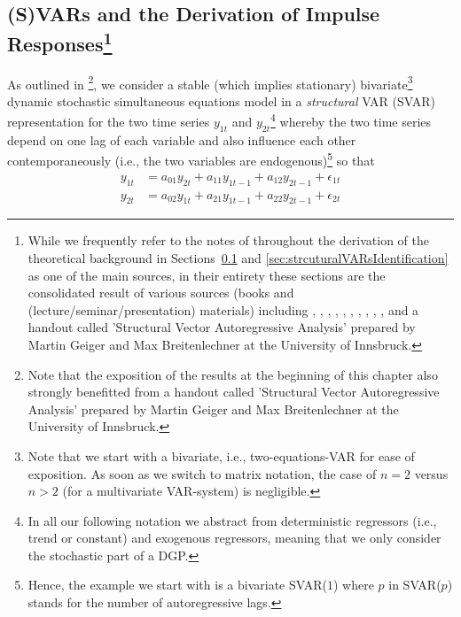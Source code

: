 \documentclass[a4paper,11pt,listof=nochaptergap,oneside,pointednumbers,bibtotoc,bigheadings,liststotoc,hidelinks]{scrbook}
\theoremstyle{mysatz}
\theoremstyle{mydefinition}
\theoremstyle{mytheorem}
\theoremstyle{mybemerkung}
\begin{document}
\subsection[(S)VARs and the Derivation of Impulse Responses]{(S)VARs and the Derivation of Impulse Responses\footnote{While we frequently refer to the notes of \citet{zivot:00} throughout the derivation of the theoretical background in Sections~\ref{sec:SVARsDerviationIRFs} and \ref{sec:strcuturalVARsIdentification} as one of the main sources, in their entirety these sections are the consolidated result of various sources (books and (lecture/seminar/presentation) materials) including \citet{lutkepohlkilian:17}, \citet{lutkepohl:05}, \citet{stockwatson:01}, \citet{hamilton:94}, \citet{villaramirez:10}, \citet{kunst:07}, \citet{whelan:16}, \citet{zivot:00}, \citet{cesa:07}, \citet{foroni:14}, \citet{rossi:11} and a handout called 'Structural Vector Autoregressive Analysis' prepared by Martin Geiger and Max Breitenlechner at the University of Innsbruck.}}
\label{sec:SVARsDerviationIRFs}
As outlined in \citet{zivot:00}\footnote{Note that the exposition of the results at the beginning of this chapter also strongly benefitted from a handout called 'Structural Vector Autoregressive Analysis' prepared by Martin Geiger and Max Breitenlechner at the University of Innsbruck. }, we consider a stable (which implies stationary) bivariate\footnote{Note that we start with a bivariate, i.e., two-equations-VAR for ease of exposition. As soon as we switch to matrix notation, the case of $n=2$ versus $n>2$ (for a multivariate VAR-system) is negligible.} dynamic stochastic simultaneous equations model in a \textit{structural} VAR (SVAR) representation for the two time series $y_{1t}$ and $y_{2t}$\footnote{In all our following notation we abstract from deterministic regressors (i.e., trend or constant) and exogenous regressors, meaning that we only consider the stochastic part of a DGP.} whereby the two time series depend on one lag of each variable and also influence each other contemporaneously (i.e., the two variables are endogenous)\footnote{Hence, the example we start with is a bivariate SVAR($1$) where $p$ in SVAR($p$) stands for the number of autoregressive lags.} so that
\begin{equation} \label{eq:svar1}
\begin{split}
	y_{1t} & = a_{01}y_{2t} + a_{11}y_{1t-1} + a_{12}y_{2t-1} + \epsilon_{1t} \\
	y_{2t} & = a_{02}y_{1t} + a_{21}y_{1t-1} + a_{22}y_{2t-1} + \epsilon_{2t}
\end{split}								
\end{equation}
\end{document}
